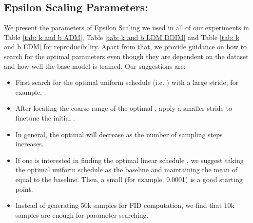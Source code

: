 \documentclass{article} \usepackage{iclr2024_conference,times}
\begin{document}
\subsection{Epsilon Scaling Parameters: \texorpdfstring{}{Lg}}
\label{Append: parameters}
We present the parameters  of Epsilon Scaling we used in all of our experiments in Table \ref{tab: k and b ADM}, Table \ref{tab: k and b LDM DDIM} and Table \ref{tab: k and b EDM} for reproducibility. Apart from that, we provide guidance on how to search for the optimal parameters even though they are dependent on the dataset and how well the base model is trained. Our suggestions are:

\begin{itemize}
    \item First search for the optimal uniform schedule  (i.e. ) with a large stride, for example, .  
    \item After locating the coarse range of the optimal , apply a smaller stride to finetune the initial .
    \item In general, the optimal  will decrease as the number of sampling steps  increases.
    \item If one is interested in finding the optimal linear schedule , we suggest taking the optimal uniform schedule  as the baseline and maintaining the mean of  equal to the baseline. Then, a small  (for example, 0.0001) is a good starting point. 
    \item Instead of generating 50k samples for FID computation, we find that 10k samples are enough for parameter searching. 
\end{itemize}
\end{document}
